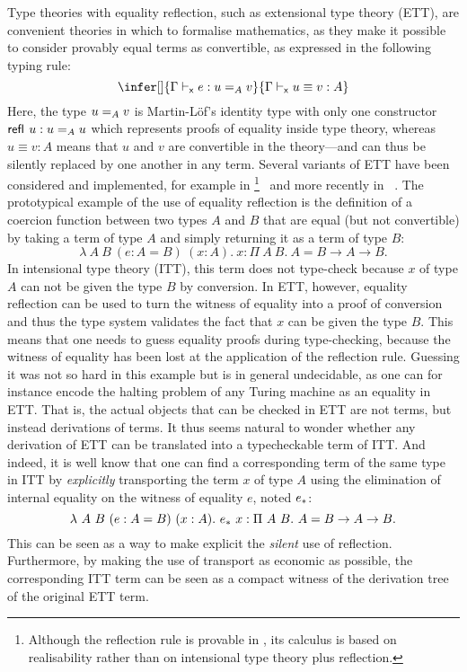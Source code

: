Type theories with equality reflection, such as extensional type
theory (ETT), are convenient theories in which to formalise
mathematics, as they make it possible to consider provably equal terms as
convertible, as expressed in the following typing rule:
%
\begin{equation}
  \label{eq:reflection}
  \infer[]
    {\xisterm{\Ga}{e}{\Eq{A}{u}{v}}}
    {\xeqterm{\Ga}{u}{v}{A}}
\end{equation}
%
Here, the type $\Eq{A}{u}{v}$ is Martin-Löf's identity type with only
one constructor $\refl{} u : \Eq{A}{u}{u}$ which represents
proofs of equality inside type theory, whereas $u \equiv v : A$ means
that $u$ and $v$ are convertible in the theory---and can thus be
silently replaced by one another in any term.
%
Several variants of ETT have been considered and implemented, for
example in \NuPRL\footnote{Although the reflection rule is provable in \NuPRL,
its calculus is based on realisability rather than on intensional type theory
plus reflection.}~\cite{DBLP:conf/cade/AllenCEKL00} and more recently in
\Andromeda~\cite{andromeda}.
%
The prototypical example of the use of equality reflection is the
definition of a coercion function between two types $A$ and $B$ that
are equal (but not convertible) by taking a term of type $A$ and
simply returning it as a term of type $B$:
\[
\lambda\ A\ B \ (e:A = B)\ (x:A).\ x
: \Pi\ A\ B.\ A = B \to A \to B.
\]
%
%
In intensional type theory (ITT), this term does not type-check
because $x$ of type $A$ can not be given the type $B$ by conversion.
%
In ETT, however, equality reflection can be used to turn the witness
of equality into a proof of conversion and thus the type system
validates the fact that $x$ can be given the type $B$.
%
This means that one needs to guess equality proofs
during type-checking, because the witness of equality has been lost at
the application of the reflection rule. Guessing it was not so hard in this
example but is in general undecidable, as one can for instance encode the
halting problem of any Turing machine as an equality in ETT.
%
That is, the actual objects that can be checked in ETT are not terms,
but instead derivations of terms.
%
It thus seems natural to wonder whether any derivation of ETT can be
translated into a typecheckable term of ITT.
%
And indeed, it is well know that one can find a corresponding term of
the same type in ITT by \emph{explicitly} transporting the term $x$
of type $A$ using the elimination of internal equality on the witness
of equality $e$, noted $\transpo{e}$:
%
\[
  \lambda\ A\ B \ (e:A = B)\ (x:A).\ \transpo{e}\ x
  : \Pi\ A\ B.\ A = B \to A \to B.
\]
%
This can be seen as a way to make explicit the \emph{silent} use of
reflection.
%
Furthermore, by making the use of transport as economic as possible,
the corresponding ITT term can be seen as a compact witness of the
derivation tree of the original ETT term.

